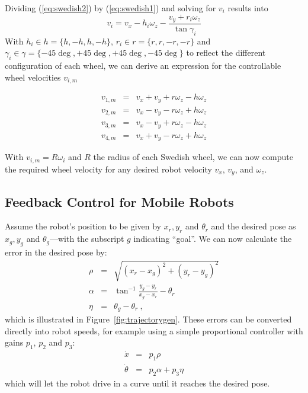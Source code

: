 Dividing (\ref{eq:swedish2}) by (\ref{eq:swedish1}) and solving for $v_i$ results into
\begin{equation}
v_i=v_x-h_i\omega_z-\frac{v_y+r_i\omega_z}{\tan{\gamma_i}}
\end{equation}
With $h_i \in h =\{h,-h,h,-h\}$, $r_i \in r=\{r,r,-r,-r\}$ and
$\gamma_i \in \gamma=\{-45\deg,+45\deg,+45\deg,-45\deg\}$ to reflect the different configuration of each wheel, we can derive an expression for the controllable wheel velocities $v_{i,m}$

\begin{eqnarray}
v_{1,m} &=& v_x+v_y+r\omega_z-h\omega_z \\
v_{2,m} &=& v_x-v_y-r\omega_z+h\omega_z \nonumber\\
v_{3,m} &=& v_x-v_y+r\omega_z-h\omega_z \nonumber\\
v_{4,m} &=& v_x+v_y-r\omega_z+h\omega_z \nonumber
\end{eqnarray}

With $v_{i,m}=R\omega_i$ and $R$ the radius of each Swedish wheel, we can now compute the required wheel velocity for any desired robot velocity $v_x$, $v_y$, and $\omega_z$.

\subsection{Feedback Control for Mobile Robots}\label{sec:fbmobile}
\label{sec:kinematics:inverse:feedbackcontrol}

Assume the robot's position to be given by $x_r, y_r$ and $\theta_r$ and the desired pose as $x_g, y_g$ and $\theta_g$---with the subscript $g$ indicating ``goal''.
We can now calculate the error in the desired pose by:
\begin{eqnarray}
\rho  &=& \sqrt{(x_r-x_g)^2+(y_r-y_g)^2} \nonumber \\
\alpha&=& \tan^{-1}{\frac{y_g-y_r}{x_g-x_r}}-\theta_r \\
\eta  &=& \theta_g-\theta_r\ , \nonumber
\end{eqnarray}
which is illustrated in Figure~\ref{fig:trajectorygen}.
These errors can be converted directly into robot speeds, for example using a simple proportional controller with gains $p_1$, $p_2$ and $p_3$:
\begin{eqnarray}
\dot{x} &=& p_1 \rho\\
\dot{\theta} &=& p_2 \alpha + p_3 \eta
\end{eqnarray}
which will let the robot drive in a curve until it reaches the desired pose.

